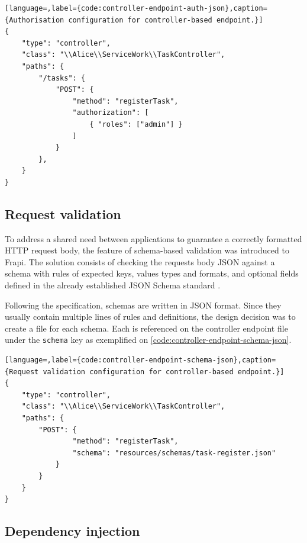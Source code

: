 \begin{lstlisting}[language=,label={code:controller-endpoint-auth-json},caption={Authorisation configuration for controller-based endpoint.}]
{
    "type": "controller",
    "class": "\\Alice\\ServiceWork\\TaskController",
    "paths": {
        "/tasks": {
            "POST": {
	            "method": "registerTask",
	            "authorization": [
                    { "roles": ["admin"] }
                ]
	        }
        },
    }
}
\end{lstlisting}

\subsection{Request validation}

To address a shared need between applications to guarantee a correctly formatted HTTP request body, the feature of schema-based validation was introduced to Frapi. The solution consists of checking the requests body JSON against a schema with rules of expected keys, values types and formats, and optional fields defined in the already established JSON Schema standard \cite{json-schema-spec}.

Following the specification, schemas are written in JSON format. Since they usually contain multiple lines of rules and definitions, the design decision was to create a file for each schema. Each is referenced on the controller endpoint file under the \texttt{schema} key as exemplified on \autoref{code:controller-endpoint-schema-json}.

\begin{lstlisting}[language=,label={code:controller-endpoint-schema-json},caption={Request validation configuration for controller-based endpoint.}]
{
	"type": "controller",
    "class": "\\Alice\\ServiceWork\\TaskController",
    "paths": {
		"POST": {
                "method": "registerTask",
                "schema": "resources/schemas/task-register.json"
            }
        }
    }
}
\end{lstlisting}

\subsection{Dependency injection}
\label{sec:dependency-injection}

